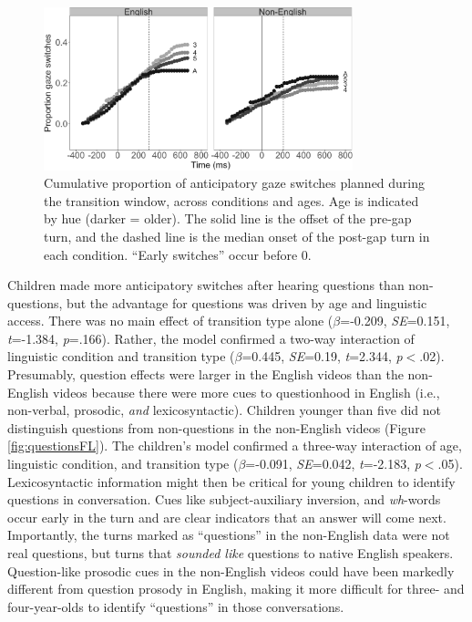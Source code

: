 \documentclass[authoryear, 12pt]{elsarticle}
\begin{document}
\begin{figure}[t]
\begin{center}
\includegraphics[width=0.8\textwidth]{figures/FIG-cumulative-FL.png}
\end{center}
\caption{Cumulative proportion of anticipatory gaze switches planned during the transition window, across conditions and ages. Age is indicated by hue (darker = older). The solid line is the offset of the pre-gap turn, and the dashed line is the median onset of the post-gap turn in each condition. ``Early switches'' occur before 0.} 
\label{fig:cumulativeFL}
\end{figure}

Children made more anticipatory switches after hearing questions than non-questions, but the advantage for questions was driven by age and linguistic access. There was no main effect of transition type alone (\textit{$\beta$}=-0.209, \textit{SE}=0.151, \textit{t}=-1.384, \textit{p}=.166). Rather, the model confirmed a two-way interaction of linguistic condition and transition type (\textit{$\beta$}=0.445, \textit{SE}=0.19, \textit{t}=2.344, \textit{p}$<$.02). Presumably, question effects were larger in the English videos than the non-English videos because there were more cues to questionhood in English (i.e., non-verbal, prosodic, \textit{and} lexicosyntactic). Children younger than five did not distinguish questions from non-questions in the non-English videos (Figure \ref{fig:questionsFL}). The children's model confirmed a three-way interaction of age, linguistic condition, and transition type (\textit{$\beta$}=-0.091, \textit{SE}=0.042, \textit{t}=-2.183, \textit{p}$<$.05). Lexicosyntactic information might then be critical for young children to identify questions in conversation. Cues like subject-auxiliary inversion, and \textit{wh}-words occur early in the turn and are clear indicators that an answer will come next. Importantly, the turns marked as ``questions'' in the non-English data were not real questions, but turns that \textit{sounded like} questions to native English speakers. Question-like prosodic cues in the non-English videos could have been markedly different from question prosody in English, making it more difficult for three- and four-year-olds to identify ``questions'' in those conversations.
\end{document}
